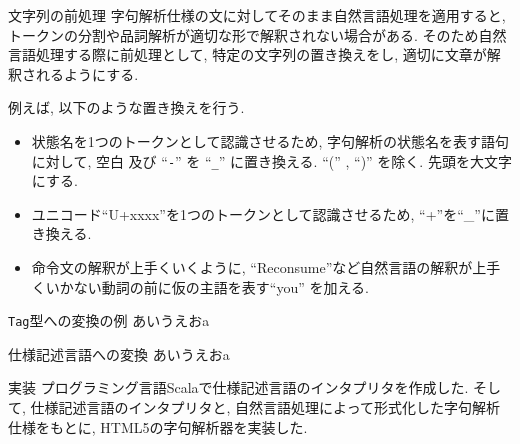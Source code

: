 \documentclass[dvipdfmx]{beamer}
\begin{document}
\begin{frame}{文字列の前処理}
字句解析仕様の文に対してそのまま自然言語処理を適用すると, トークンの分割や品詞解析が適切な形で解釈されない場合がある. 
そのため自然言語処理する際に前処理として, 特定の文字列の置き換えをし, 適切に文章が解釈されるようにする. 

例えば, 以下のような置き換えを行う. 
   \begin{itemize}
    \item 状態名を1つのトークンとして認識させるため, 字句解析の状態名を表す語句に対して, 空白 及び ``\texttt{-}'' を ``\texttt{\_}'' に置き換える. ``('' , ``)'' を除く. 先頭を大文字にする.
    \item ユニコード``U+xxxx''を1つのトークンとして認識させるため, ``+''を``\_''に置き換える. 
    \item 命令文の解釈が上手くいくように, ``Reconsume''など自然言語の解釈が上手くいかない動詞の前に仮の主語を表す``you'' を加える. 
 \end{itemize}
\end{frame}

\begin{frame}{\texttt{Tag}型への変換の例}
   あいうえおa
\end{frame}

\begin{frame}{仕様記述言語への変換}
   あいうえおa
\end{frame}

\begin{frame}{実装}
   プログラミング言語Scalaで仕様記述言語のインタプリタを作成した. 
そして, 仕様記述言語のインタプリタと, 自然言語処理によって形式化した字句解析仕様をもとに, HTML5の字句解析器を実装した. 


\end{frame}
\end{document}
